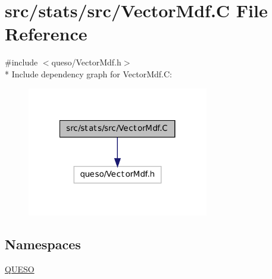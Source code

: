 \hypertarget{_vector_mdf_8_c}{\section{src/stats/src/\-Vector\-Mdf.C File Reference}
\label{_vector_mdf_8_c}
}
{\ttfamily \#include $<$queso/\-Vector\-Mdf.\-h$>$}\\*
Include dependency graph for Vector\-Mdf.\-C\-:
\nopagebreak
\begin{figure}[H]
\begin{center}
\leavevmode
\includegraphics[width=224pt]{_vector_mdf_8_c__incl}
\end{center}
\end{figure}
\subsection*{Namespaces}
\begin{DoxyCompactItemize}
\item 
\hyperlink{namespace_q_u_e_s_o}{Q\-U\-E\-S\-O}
\end{DoxyCompactItemize}
